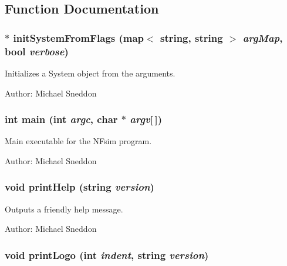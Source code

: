 \subsection{Function Documentation}
\subsubsection{ $\ast$ initSystemFromFlags (map$<$ string, string $>$ {\em argMap}, bool {\em verbose})}\label{NFsim_8cpp_ba72a46366f8d33295a853f07c43a288}


Initializes a System object from the arguments. 

\begin{Desc}
\item[Author:]Michael Sneddon \end{Desc}
\subsubsection{\setlength{\rightskip}{0pt plus 5cm}int main (int {\em argc}, char $\ast$ {\em argv}[$\,$])}\label{NFsim_8cpp_0ddf1224851353fc92bfbff6f499fa97}


Main executable for the NFsim program. 

\begin{Desc}
\item[Author:]Michael Sneddon \end{Desc}
\subsubsection{\setlength{\rightskip}{0pt plus 5cm}void printHelp (string {\em version})}\label{NFsim_8cpp_e16641224ad0a169d8db2dbcec348157}


Outputs a friendly help message. 

\begin{Desc}
\item[Author:]Michael Sneddon \end{Desc}
\subsubsection{\setlength{\rightskip}{0pt plus 5cm}void printLogo (int {\em indent}, string {\em version})}\label{NFsim_8cpp_74763fe62871a5e5e685b885c63d30a4}


